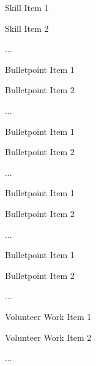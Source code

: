 \documentclass{template}
\begin{document}
\header


\begin{skills}
    \item Skill Item 1
    \item Skill Item 2
    \item ...
\end{skills}

\begin{professionalhistory}
\begin{bulletpoints}
    \item Bulletpoint Item 1
    \item Bulletpoint Item 2
    \item ...
\end{bulletpoints}

\begin{bulletpoints}
    \item Bulletpoint Item 1
    \item Bulletpoint Item 2
    \item ...
\end{bulletpoints}
\begin{bulletpoints}
    \item Bulletpoint Item 1
    \item Bulletpoint Item 2
    \item ...
\end{bulletpoints}

\begin{bulletpoints}
    \item Bulletpoint Item 1
    \item Bulletpoint Item 2
    \item ...
\end{bulletpoints}
\end{professionalhistory}

\begin{volunteerwork}
    \item Volunteer Work Item 1
    \item Volunteer Work Item 2
    \item ...
\end{volunteerwork}
\end{document}
